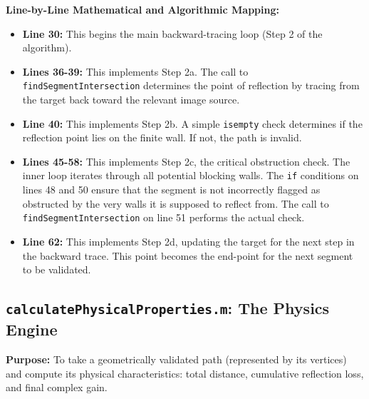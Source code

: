 \documentclass{article}
\begin{document}
	
	
	\textbf{Line-by-Line Mathematical and Algorithmic Mapping:}
	\begin{itemize}
		\item \textbf{Line 30:} This begins the main backward-tracing loop (Step 2 of the algorithm).
		\item \textbf{Lines 36-39:} This implements Step 2a. The call to \texttt{findSegmentIntersection} determines the point of reflection by tracing from the target back toward the relevant image source.
		\item \textbf{Line 40:} This implements Step 2b. A simple \texttt{isempty} check determines if the reflection point lies on the finite wall. If not, the path is invalid.
		\item \textbf{Lines 45-58:} This implements Step 2c, the critical obstruction check. The inner loop iterates through all potential blocking walls. The \texttt{if} conditions on lines 48 and 50 ensure that the segment is not incorrectly flagged as obstructed by the very walls it is supposed to reflect from. The call to \texttt{findSegmentIntersection} on line 51 performs the actual check.
		\item \textbf{Line 62:} This implements Step 2d, updating the target for the next step in the backward trace. This point becomes the end-point for the next segment to be validated.
	\end{itemize}
	
	\subsection{\texttt{calculatePhysicalProperties.m}: The Physics Engine}
	\textbf{Purpose:} To take a geometrically validated path (represented by its vertices) and compute its physical characteristics: total distance, cumulative reflection loss, and final complex gain.
	
\end{document}
